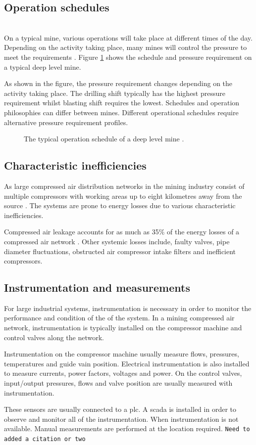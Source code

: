 \subsection{Operation schedules}\leavevmode\\
	On a typical mine, various operations will take place at different times of the day. Depending on the activity taking place, many mines will control the pressure to meet the requirements \cite{Kriel2014Masters,Marais2012PhD}. Figure \ref{fig: Mining schedule} shows the schedule and pressure requirement on a typical deep level mine.\par 
	As shown in the figure, the pressure requirement changes depending on the activity taking place. The drilling shift typically has the highest pressure requirement whilst blasting shift requires the lowest. Schedules and operation philosophies can differ between mines. Different operational schedules require alternative pressure requirement profiles.
		\begin{figure}[h]
		\centering
		\fbox{}
		\caption[A typical operation schedule of a deep level mine.]{The typical operation schedule of a deep level mine \cite{Kriel2014Masters}.}
		\label{fig: Mining schedule}
	\end{figure}
	

	\subsection{Characteristic inefficiencies}
	As large compressed air distribution networks in the mining industry consist of multiple compressors with working areas up to eight kilometres away from the source \cite{Marais2012PhD}. The systems are prone to energy losses due to various characteristic inefficiencies. \par 
	Compressed air leakage accounts for as much as 35\% of the energy losses of a compressed air network \cite{Lawrence2004Improving}. Other systemic losses include, faulty valves, pipe diameter fluctuations, obstructed air compressor intake filters and inefficient compressors. \par
	\subsection{Instrumentation and measurements}
	For large industrial systems, instrumentation is necessary in order to monitor the performance and condition of the of the system. In a mining compressed air network, instrumentation is typically installed on the compressor machine and control valves along the network.\par 
	Instrumentation on the compressor machine usually measure flows, pressures, temperatures and guide vain position. Electrical instrumentation is also installed to measure currents, power factors, voltages and power. On the control valves, input/output pressures, flows and valve position are usually measured with instrumentation.\par 
	These sensors are usually connected to a \gls{plc}. A \gls{scada} is installed in order to observe and monitor all of the instrumentation. When instrumentation is not available. Manual measurements are performed at the location required.
	\texttt{Need to added a citation or two}
